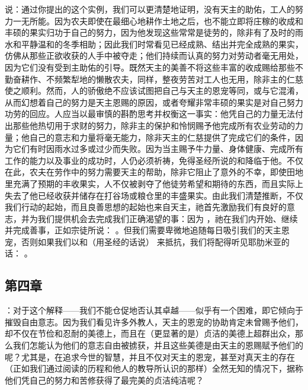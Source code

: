 说：通过你提出的这个实例，我们可以更清楚地证明，没有天主的助佑，工人的努力一无所能。因为农夫即使在最细心地耕作土地之后，也不能立即将庄稼的收成和丰硕的果实归功于自己的努力，因为他发现这些常常是徒劳的，除非有了及时的雨水和平静温和的冬季相助；因此我们时常看见已经成熟、结出并完全成熟的果实，仿佛从那些正欲收获的人手中被夺走；他们持续而认真的努力对劳动者毫无用处，因为它们没有受到主助佑的引导。既然天主的美善不将这些丰富的收成赐给那些不勤奋耕作、不频繁犁地的懒散农夫，同样，整夜劳苦对工人也无用，除非主的仁慈使之顺利。然而，人的骄傲绝不应该试图把自己与天主的恩宠等同，或与它混淆，从而幻想着自己的努力是天主恩赐的原因，或者夸耀非常丰硕的果实是对自己努力功劳的回应。人应当以最审慎的斟酌思考并权衡这一事实：他凭自己的力量无法付出那些他热切用于求财的努力，除非主的保护和怜悯赐予他完成所有农业劳动的力量；他自己的意志和力量将毫无能力，除非天主的仁慈提供了完成它们的条件，因为它们有时因雨水过多或过少而失败。因为当主赐予牛力量、身体健康、完成所有工作的能力以及事业的成功时，人仍必须祈祷，免得圣经所说的和降临于他。不仅在此，农夫在劳作中的努力需要天主的帮助，除非它阻止了意外的不幸，即使田地里充满了预期的丰收果实，人不仅被剥夺了他徒劳希望和期待的东西，而且实际上失去了他已经收获并储存在打谷场或粮仓里的丰盛果实。由此我们清楚推断，不仅我们行动的起始，而且良善思想的起始也来自天主，祂首先激励我们有良好的意志，并为我们提供机会去完成我们正确渴望的事：因为 ，祂在我们内开始、继续并完成善事，正如宗徒所说： 。但我们需要卑微地追随每日吸引我们的天主恩宠，否则如果我们以和（用圣经的话说） 来抵抗，我们将配得听见耶肋米亚的话： 。\par


\subsection{第四章}

\par

：对于这个解释——我们不能仓促地否认其卓越——似乎有一个困难，即它倾向于摧毁自由意志。因为我们看见许多外教人，天主的恩宠的协助肯定未曾赐予他们，却不仅在节俭和忍耐的美德上，而且在（更显著的是）贞洁的美德上超群出众，那么我们怎能认为他们的意志自由被掳获，并且这些美德是由天主的恩赐赋予他们的呢？尤其是，在追求今世的智慧，并且不仅对天主的恩宠，甚至对真天主的存在（正如我们通过阅读的历程和他人的教导所认识的那样）全然无知的情况下，据称他们凭自己的努力和苦修获得了最完美的贞洁纯洁呢？\par


